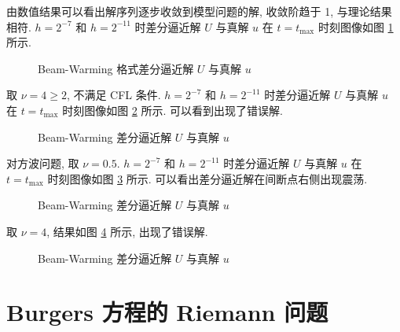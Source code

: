 \documentclass[UTF8, a4paper, 12pt, oneside, onecolumn]{article}
\begin{document}
由数值结果可以看出解序列逐步收敛到模型问题的解, 收敛阶趋于 1, 与理论结果相符. $h = 2^{-7}$ 和 $h = 2^{-11}$ 时差分逼近解 $U$ 与真解 $u$ 在 $t = t_{\max }$ 时刻图像如图 \ref{fig:beam_warming_Uu} 所示.

\begin{figure}[H]\centering{}
	\resizebox{0.4\linewidth}{!}{}\quad
	\resizebox{0.4\linewidth}{!}{}
	\caption{Beam-Warming 格式差分逼近解 $U$ 与真解 $u$}\label{fig:beam_warming_Uu}
\end{figure}

取 $\nu = 4 \geq 2$, 不满足 CFL 条件. $h = 2^{-7}$ 和 $h = 2^{-11}$ 时差分逼近解 $U$ 与真解 $u$ 在 $t = t_{\max }$ 时刻图像如图 \ref{fig:beam_warming_Uu_noCFL} 所示. 可以看到出现了错误解.

\begin{figure}[H]\centering{}
	\resizebox{0.4\linewidth}{!}{}\quad
	\resizebox{0.4\linewidth}{!}{}
	\caption{Beam-Warming 差分逼近解 $U$ 与真解 $u$}\label{fig:beam_warming_Uu_noCFL}
\end{figure}

对方波问题, 取 $\nu = 0.5$. $h = 2^{-7}$ 和 $h = 2^{-11}$ 时差分逼近解 $U$ 与真解 $u$ 在 $t = t_{\max }$ 时刻图像如图 \ref{fig:beam_warming_square_Uu} 所示. 可以看出差分逼近解在间断点右侧出现震荡.

\begin{figure}[H]\centering{}
	\resizebox{0.4\linewidth}{!}{}\quad
	\resizebox{0.4\linewidth}{!}{}
	\caption{Beam-Warming 差分逼近解 $U$ 与真解 $u$}\label{fig:beam_warming_square_Uu}
\end{figure}

取 $\nu = 4$, 结果如图 \ref{fig:beam_warming_square_Uu_noCFL} 所示, 出现了错误解.

\begin{figure}[H]\centering{}
	\resizebox{0.4\linewidth}{!}{}\quad
	\resizebox{0.4\linewidth}{!}{}
	\caption{Beam-Warming 差分逼近解 $U$ 与真解 $u$}\label{fig:beam_warming_square_Uu_noCFL}
\end{figure}

\section{Burgers 方程的 Riemann 问题}
\end{document}
